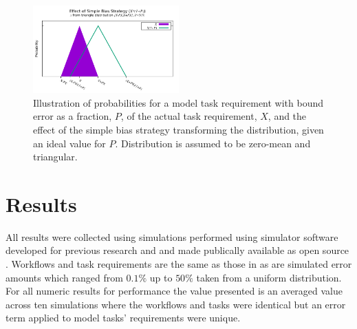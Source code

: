 \documentclass[10pt]{csce}
\begin{document}
\begin{figure}
	\begin{center}
		\includegraphics[width=0.5\textwidth]{figures/BiasVisualization_Simple.pdf}
	\end{center}
	\caption{Illustration of probabilities for a model task requirement
		with bound error as a fraction, $P$, of the actual task
		requirement, $X$, and the effect of the simple bias strategy
		transforming the distribution, given an ideal value for $P$.
		Distribution is assumed to be zero-mean and triangular.}
	\label{fig:sbias}
\end{figure}

\section{Results}
\label{sec:Results}

All results were collected using simulations performed using simulator software
developed for previous research \cite{pdpta18} and \cite{costmin} and made
publically available as open source \cite{soasim}.  Workflows and task
requirements are the same as those in \cite{pdpta18} as are simulated error
amounts which ranged from $0.1\%$ up to $50\%$ taken from a uniform
distribution.  For all numeric results for performance the value presented is
an averaged value across ten simulations where the workflows and tasks were
identical but an error term applied to model tasks' requirements were unique.
\end{document}
